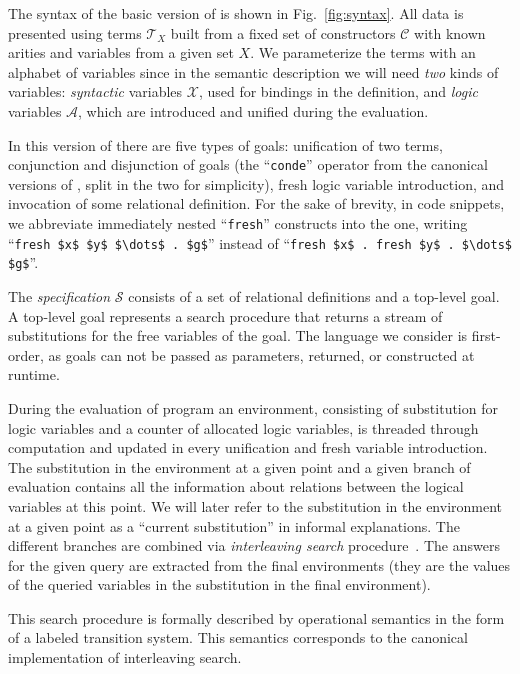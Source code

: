 The syntax of the basic version of \mK is shown in Fig.~\ref{fig:syntax}. 
All data is presented using terms $\mathcal{T}_X$ built from a fixed set of constructors $\mathcal{C}$ with known arities and variables
from a given set $X$.
We parameterize the terms with an alphabet of variables since in the semantic description we will need \emph{two} kinds of variables:
\emph{syntactic} variables $\mathcal{X}$, used for bindings in the definition, and \emph{logic} variables $\mathcal{A}$, which are
introduced and unified during the evaluation.

In this version of \mK there are five types of goals: unification of two terms, conjunction and disjunction of goals (the
``\lstinline|conde|'' operator from the canonical versions of \mK, split in the two for simplicity), fresh logic variable introduction, and
invocation of some relational definition. For the sake of brevity, in code snippets, we abbreviate immediately nested ``\lstinline|fresh|''
constructs into the one, writing ``\lstinline|fresh $x$ $y$ $\dots$ . $g$|'' instead of
``\lstinline|fresh $x$ . fresh $y$ . $\dots$ $g$|''.

The \emph{specification} $\mathcal{S}$ consists of a set of relational definitions and a top-level goal.
A top-level goal represents a search procedure that returns a stream of substitutions for the free variables of the goal.
The language we consider is first-order, as goals can not be passed as parameters, returned, or constructed at runtime.

During the evaluation of \mK program an environment, consisting of substitution for logic variables and a counter of allocated logic
variables, is threaded through computation and updated in every unification and fresh variable introduction.
The substitution in the environment at a given point and a given branch of evaluation contains all the information about relations between
the logical variables at this point. We will later refer to the substitution in the environment at a given point as a ``current substitution''
in informal explanations.
The different branches are combined via \emph{interleaving search} procedure~\cite{InterleavingSearch}.
The answers for the given query are extracted from the final environments (they are the values of the queried variables in the substitution
in the final environment).

This search procedure is formally described by operational semantics in the form of a labeled transition system.
This semantics corresponds to the canonical implementation of interleaving search. 

